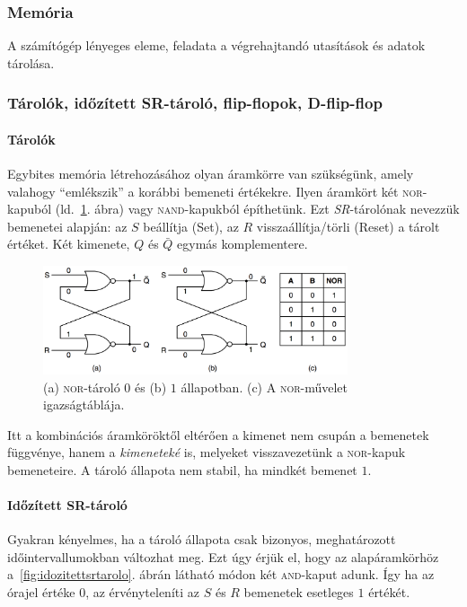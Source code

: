 \documentclass[10pt]{article}
\begin{document}
\subsubsection{Memória}

A számítógép lényeges eleme, feladata a végrehajtandó utasítások és adatok tárolása.

\subsubsection{Tárolók, időzített SR-tároló, flip-flopok, D-flip-flop}

\paragraph{Tárolók}

Egybites memória létrehozásához olyan áramkörre van szükségünk, amely valahogy ``emlékszik'' a korábbi bemeneti értékekre. Ilyen áramkört két \textsc{nor}-kapuból (ld.~\ref{fig:tarolo}. ábra) vagy \textsc{nand}-kapukból építhetünk. Ezt \emph{SR}-tárolónak nevezzük bemenetei alapján: az $S$ beállítja (Set), az $R$ visszaállítja/törli (Reset) a tárolt értéket. Két kimenete, $Q$ és $\bar{Q}$ egymás komplementere.

\begin{figure}[htbp]
	\centering
		\includegraphics[width=0.8\textwidth]{img/tarolo}
	\caption{(a) \textsc{nor}-tároló $0$ és (b) $1$ állapotban. (c) A \textsc{nor}-művelet igazságtáblája.\label{fig:tarolo}}
\end{figure}

Itt a kombinációs áramköröktől eltérően a kimenet nem csupán a bemenetek függvénye, hanem a \emph{kimeneteké} is, melyeket visszavezetünk a \textsc{nor}-kapuk bemeneteire. A tároló állapota nem stabil, ha mindkét bemenet $1$.

\paragraph{Időzített SR-tároló}

Gyakran kényelmes, ha a tároló állapota csak bizonyos, meghatározott időintervallumokban változhat meg. Ezt úgy érjük el, hogy az alapáramkörhöz a~\ref{fig:idozitettsrtarolo}. ábrán látható módon két \textsc{and}-kaput adunk. Így ha az órajel értéke $0$, az érvényteleníti az $S$ és $R$ bemenetek esetleges $1$ értékét.
\end{document}
